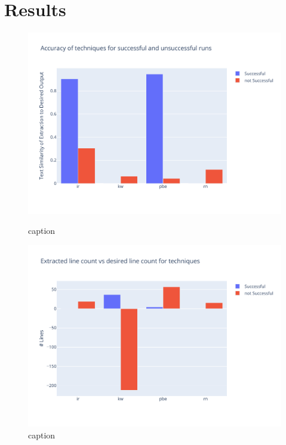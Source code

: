 \documentclass[\myrootdir/main.tex]{subfiles}
\begin{document}
\section{Results}
\begin{figure}[hp]
	\centering
	\begin{minipage}{0.45\textwidth}
		\centering
		\includegraphics[width=\textwidth, clip]{img/big-study/accuracy-success-all.pdf}
		\caption{caption}
		\label{fig:accuracy-success-all}
	\end{minipage}\hfill
	\begin{minipage}{0.45\textwidth}
		\centering
		\includegraphics[width=\textwidth, clip]{img/big-study/line-diff-all.pdf}
		\caption{caption}
		\label{fig:line-diff-all}
	\end{minipage}
\end{figure}
\end{document}
